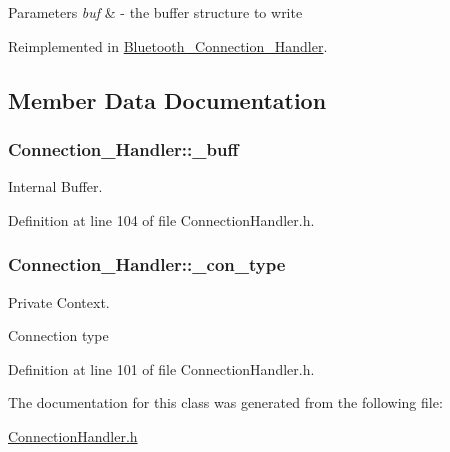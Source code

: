 \begin{DoxyParams}{\-Parameters}
{\em buf} & -\/ the buffer structure to write \\
\hline
\end{DoxyParams}


\-Reimplemented in \hyperlink{class_bluetooth___connection___handler_afb57232b5a23ddc1be523b9fe6b275b5}{\-Bluetooth\-\_\-\-Connection\-\_\-\-Handler}.



\subsection{\-Member \-Data \-Documentation}
\hypertarget{class_connection___handler_ad1eca58f0f8cb43147ce961389293b37}{
\subsubsection[{\-\_\-buff}]{ {\bf \-Connection\-\_\-\-Handler\-::\-\_\-buff}}}\label{class_connection___handler_ad1eca58f0f8cb43147ce961389293b37}


\-Internal \-Buffer. 



\-Definition at line 104 of file \-Connection\-Handler.\-h.

\hypertarget{class_connection___handler_a3ac7a0346fb72ae55ffa867465e397f2}{
\subsubsection[{\-\_\-con\-\_\-type}]{ {\bf \-Connection\-\_\-\-Handler\-::\-\_\-con\-\_\-type}}}\label{class_connection___handler_a3ac7a0346fb72ae55ffa867465e397f2}


\-Private \-Context. 

\-Connection type 

\-Definition at line 101 of file \-Connection\-Handler.\-h.



\-The documentation for this class was generated from the following file\-:\begin{DoxyCompactItemize}
\item 
\hyperlink{_connection_handler_8h}{\-Connection\-Handler.\-h}\end{DoxyCompactItemize}
